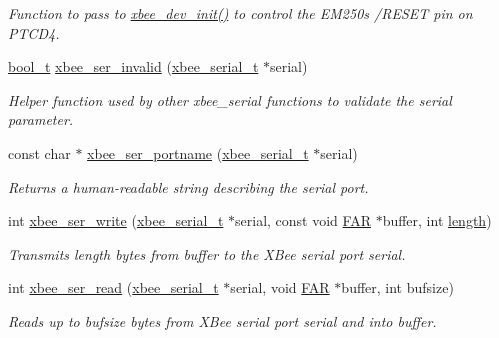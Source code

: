 \begin{DoxyCompactItemize}
\begin{DoxyCompactList}\small\item\em Function to pass to \hyperlink{group__xbee__device_ga550d7c865e75d3fc1df0e64cb880cf3d}{xbee\+\_\+dev\+\_\+init()} to control the E\+M250\textquotesingle{}s /\+R\+E\+S\+ET pin on P\+T\+C\+D4. \end{DoxyCompactList}\item 
\hyperlink{group__hal__dos_ga04dd5074964518403bf944f2b240a5f8}{bool\+\_\+t} \hyperlink{group__hal__hcs08_ga9bf21a5b024e4919bbe8b605c8f45351}{xbee\+\_\+ser\+\_\+invalid} (\hyperlink{structxbee__serial__t}{xbee\+\_\+serial\+\_\+t} $\ast$serial)
\begin{DoxyCompactList}\small\item\em Helper function used by other xbee\+\_\+serial functions to validate the {\itshape serial} parameter. \end{DoxyCompactList}\item 
const char $\ast$ \hyperlink{group__hal__hcs08_ga898057d1b7645785e7f3d6256828d039}{xbee\+\_\+ser\+\_\+portname} (\hyperlink{structxbee__serial__t}{xbee\+\_\+serial\+\_\+t} $\ast$serial)
\begin{DoxyCompactList}\small\item\em Returns a human-\/readable string describing the serial port. \end{DoxyCompactList}\item 
int \hyperlink{group__hal__hcs08_ga2ca4e60c9d642084afa52dff9e1f6be4}{xbee\+\_\+ser\+\_\+write} (\hyperlink{structxbee__serial__t}{xbee\+\_\+serial\+\_\+t} $\ast$serial, const void \hyperlink{group__hal_gaef060b3456fdcc093a7210a762d5f2ed}{F\+AR} $\ast$buffer, int \hyperlink{group__zdo_gab2b3adeb2a67e656ff030b56727fd0ac}{length})
\begin{DoxyCompactList}\small\item\em Transmits {\itshape length} bytes from {\itshape buffer} to the X\+Bee serial port {\itshape serial}. \end{DoxyCompactList}\item 
int \hyperlink{group__hal__hcs08_ga8263312373c03a79a718142e051b3342}{xbee\+\_\+ser\+\_\+read} (\hyperlink{structxbee__serial__t}{xbee\+\_\+serial\+\_\+t} $\ast$serial, void \hyperlink{group__hal_gaef060b3456fdcc093a7210a762d5f2ed}{F\+AR} $\ast$buffer, int bufsize)
\begin{DoxyCompactList}\small\item\em Reads up to {\itshape bufsize} bytes from X\+Bee serial port {\itshape serial} and into {\itshape buffer}. \end{DoxyCompactList}\item 

\end{DoxyCompactItemize}
